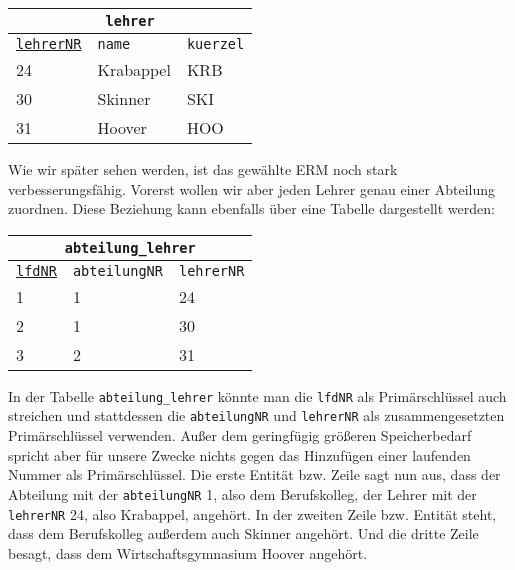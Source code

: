 \begin{tabular}{lll}
	\multicolumn{3}{c}{\lstinline!lehrer!}\\
	\hline
	\underline{\lstinline!lehrerNR!}&\lstinline!name!&\lstinline!kuerzel!\\
	\hline
	24&Krabappel&KRB\\
	30&Skinner&SKI\\
	31&Hoover&HOO\\
\end{tabular}

\medskip

Wie wir später sehen werden, ist das gewählte ERM noch stark verbesserungsfähig. Vorerst wollen wir aber jeden Lehrer genau einer Abteilung zuordnen. Diese Beziehung kann ebenfalls über eine Tabelle dargestellt werden:

\medskip

\begin{tabular}{lll}
	\multicolumn{3}{c}{\lstinline!abteilung_lehrer!}\\
	\hline
	\underline{\lstinline!lfdNR!}&\lstinline!abteilungNR!&\lstinline!lehrerNR!\\
	\hline
	1&1&24\\
	2&1&30\\
	3&2&31\\
\end{tabular}

\medskip

In der Tabelle \lstinline!abteilung_lehrer! könnte man die \lstinline!lfdNR! als Primärschlüssel auch streichen und stattdessen die \lstinline!abteilungNR! und \lstinline!lehrerNR! als zusammengesetzten Primärschlüssel verwenden. Außer dem geringfügig größeren Speicherbedarf spricht aber für unsere Zwecke nichts gegen das Hinzufügen einer laufenden Nummer als Primärschlüssel. Die erste Entität bzw. Zeile sagt nun aus, dass der Abteilung mit der \lstinline!abteilungNR! 1, also dem Berufskolleg, der Lehrer mit der \lstinline!lehrerNR! 24, also Krabappel, angehört. In der zweiten Zeile bzw. Entität steht, dass dem Berufskolleg außerdem auch Skinner angehört. Und die dritte Zeile besagt, dass dem Wirtschaftsgymnasium Hoover angehört.

